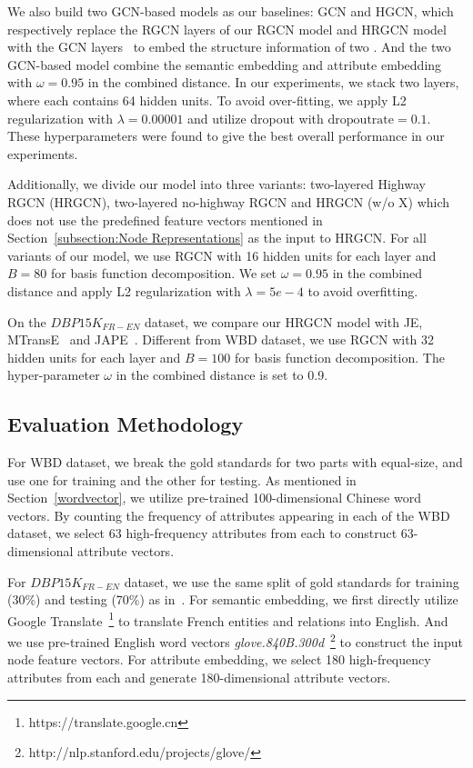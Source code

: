 	We also build two GCN-based models as our baselines: GCN and HGCN, which respectively replace the RGCN layers of our RGCN model and HRGCN model with the GCN layers~\cite{Kipf2016Semi} to embed the structure information of two \KGs. 
	And the two GCN-based model combine the semantic embedding and attribute embedding with $\omega=0.95$ in the combined distance. 
	In our experiments, we stack two \GCN layers, where each \GCN contains 64 hidden units. 
	To avoid over-fitting, we apply L2 regularization with $\lambda=0.00001$ and utilize dropout with $\mathrm{dropout rate}=0.1$.
	These hyperparameters were found to give the best overall performance in our experiments.
	
	Additionally, we divide our model into three variants: two-layered Highway RGCN (HRGCN), two-layered no-highway RGCN and HRGCN (w/o X) which does not use the predefined feature vectors mentioned in Section~\ref{subsection:Node Representations} as the input to HRGCN. For all variants of our model, we use RGCN with 16 hidden units for each layer and $B = 80$ for basis function decomposition. 
	We set $\omega=0.95$ in the combined distance and apply L2 regularization with $\lambda=5e-4$ to avoid overfitting. 
	
	On the $DBP15K_{FR-EN}$ dataset, we compare our HRGCN model with JE, MTransE~\cite{chen2016multilingual} and JAPE~\cite{sun2017cross}. 
	Different from WBD dataset, we use RGCN with 32 hidden units for each layer and $B = 100$ for basis function decomposition. 
	The hyper-parameter $\omega$ in the combined distance is set to 0.9.



	\subsection{Evaluation Methodology}
	
	For WBD dataset, we break the gold standards for two parts with equal-size, and use one for training and the other for testing. 
	As mentioned in Section~\ref{wordvector}, we utilize pre-trained 100-dimensional Chinese word vectors. 
	By counting the frequency of attributes appearing in each \KG of the WBD dataset, we select 63 high-frequency attributes from each \KG to construct 63-dimensional attribute vectors.
	
	For $DBP15K_{FR-EN}$ dataset, we use the same split of gold standards for training (30\%) and testing (70\%) as in~\cite{sun2017cross}. 
	For semantic embedding, we first directly utilize Google Translate~\footnote{https://translate.google.cn} to translate French entities and relations into English. 
	And we use pre-trained English word vectors \emph{glove.840B.300d}~\footnote{http://nlp.stanford.edu/projects/glove/} to construct the input node feature vectors. 
	For attribute embedding, we select 180 high-frequency attributes from each \KG and generate 180-dimensional attribute vectors.
	
